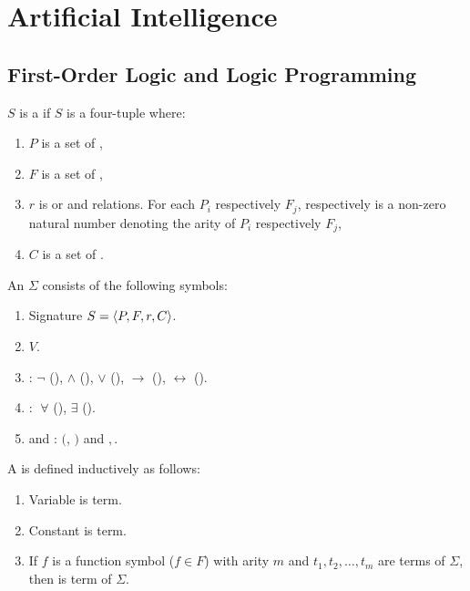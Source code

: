 \chapter{Artificial Intelligence}

\section{First-Order Logic and Logic Programming}

\begin{defi}[Signature]
$S$ is a  if $S$ is a four-tuple  where:
\begin{enumerate}
\item $P$ is a set of  ,
\item $F$ is a set of  ,
\item $r$ is  or  and relations. For each $P_i$ respectively $F_j$,  respectively  is a non-zero natural number denoting the arity of $P_i$ respectively $F_j$,
\item $C$ is a set of .
\end{enumerate}
\cite{conf/fedcsis/Telnarova12}
\end{defi}

\begin{defi}[Alphabet]
An  $\Sigma$ consists of the following symbols:
\begin{enumerate}
\item Signature $S=\left\langle P,F,r,C\right\rangle$.
\item {} $V$.
\item {}: $\neg$ (), $\wedge$ (), $\vee$ (), $\rightarrow$ (), $\leftrightarrow$ ().
\item {}: $\forall$ (), $\exists$ ().
\item {} and : $($, $)$ and $,$.
\end{enumerate}
\cite{conf/fedcsis/Telnarova12}
\end{defi}

\begin{defi}[Term]
A  is defined inductively as follows:
\begin{enumerate}
\item Variable is term.
\item Constant is term.
\item If $f$ is a function symbol ($f\in F$) with arity $m$ and $t_1,t_2,\ldots,t_m$ are terms of $\Sigma$, then  is term of $\Sigma$.
\end{enumerate}
\cite{conf/fedcsis/Telnarova12}
\end{defi}

